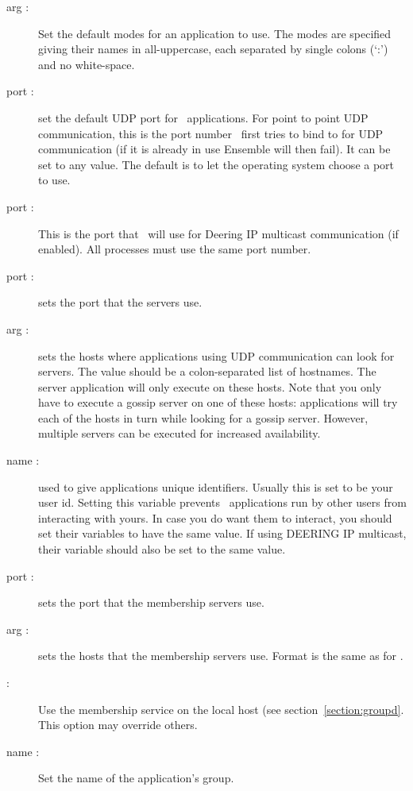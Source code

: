 \begin{description}
\item
[ arg :] Set the default modes for an application to use.  The
modes are specified giving their names in all-uppercase, each separated by
single colons (`:') and no white-space.
\item
[ port :] set the default UDP port for \ensemble\
applications.  For point to point UDP communication, this is the port
number \ensemble\ first tries to bind to for UDP communication (if it
is already in use Ensemble will then fail).  It can be set to any
value.  The default is to let the operating system choose a port to
use.
\item
[ port :] This is the port that \ensemble\ will
use for Deering IP multicast communication (if enabled).  All
processes must use the same port number.
\item
[ port :] sets the port that the  servers
use.
\item
[ arg :] sets the hosts where applications using UDP
communication can look for  servers.  The value should be a
colon-separated list of hostnames.  The \mlval{gossip} server application will
only execute on these hosts.  Note that you only have to execute a gossip
server on one of these hosts: applications will try each of the hosts in turn
while looking for a gossip server.  However, multiple servers can be executed
for increased availability.
\item
[ name :] used to give applications unique identifiers.
Usually this is set to be your user id.  Setting this variable
prevents \ensemble\ applications run by other users from interacting
with yours.  In case you do want them to interact, you should set
their variables to have the same value.  If using DEERING IP
multicast, their  variable should also be set to
the same value.
\item
[ port :] sets the port that the membership 
servers use.
\item
[ arg :] sets the hosts that the membership
\mlval{groupd} servers use.  Format is the same as for .
\item
[ :] Use the membership service on the local host (see
section~\ref{section:groupd}.  This option may override others.
\item
[ name :] Set the name of the application's group.

\end{description}
